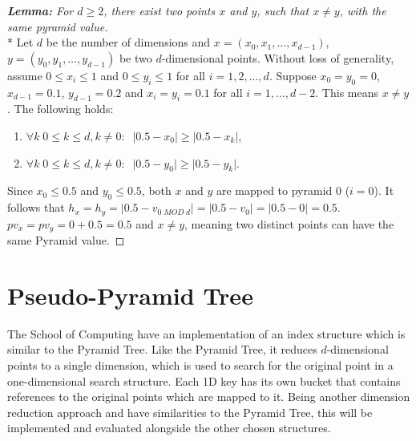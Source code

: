 \begin{proof}[\textbf{Lemma: } For $d \geq 2$, there exist two points $x$ and $y$, such that $x \neq y$, with the same pyramid value]\mbox{}\\*
Let $d$ be the number of dimensions and $x = (x_0, x_1, \dots, x_{d -1})$, $y = (y_0, y_1, \dots, y_{d - 1})$ be two $d$-dimensional points. Without loss of generality, assume $0 \leq x_i \leq 1$ and $0 \leq y_i \leq 1$ for all $i = 1, 2, \dots, d$. Suppose $x_0 = y_0 = 0$, $x_{d - 1} = 0.1$, $y_{d - 1} = 0.2$ and $x_i = y_i = 0.1$ for all $i = 1, \dots, {d - 2}$. This means $x \neq y$. The following holds:
\begin{enumerate}
	\item $\forall k \; 0 \leq k \leq d, k \neq 0: \;\; \lvert 0.5 - x_0 \rvert \geq \lvert 0.5 - x_k \rvert$,
	\item $\forall k \; 0 \leq k \leq d, k \neq 0: \;\; \lvert 0.5 - y_0 \rvert \geq \lvert 0.5 - y_k \rvert$.
\end{enumerate}
Since $x_0 \leq 0.5$ and $y_0 \leq 0.5$, both $x$ and $y$ are mapped to pyramid 0 ($i = 0$). It follows that $h_x = h_y = \lvert 0.5 - v_{0 \; MOD \; d} \rvert = \lvert 0.5 - v_{0} \rvert = \lvert 0.5 - 0 \rvert = 0.5$. $pv_x = pv_y = 0 + 0.5 = 0.5$ and $x \neq y$, meaning two distinct points can have the same Pyramid value.

\end{proof}

\section{Pseudo-Pyramid Tree}

The School of Computing have an implementation of an index structure which is similar to the Pyramid Tree. Like the Pyramid Tree, it reduces $d$-dimensional points to a single dimension, which is used to search for the original point in a one-dimensional search structure. Each 1D key has its own bucket that contains references to the original points which are mapped to it. Being another dimension reduction approach and have similarities to the Pyramid Tree, this will be implemented and evaluated alongside the other chosen structures. 

